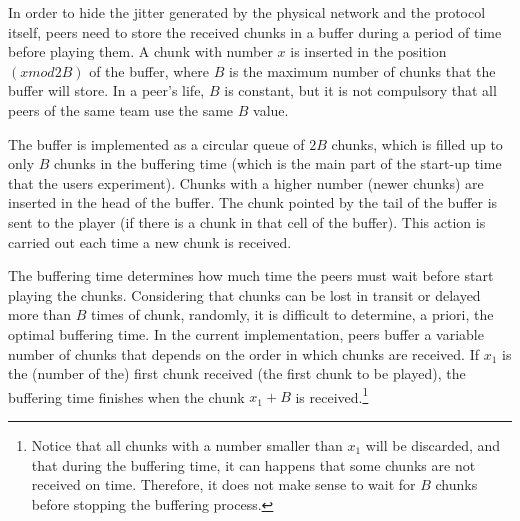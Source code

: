 
\label{sec:buffering_chunks}

In order to hide the jitter generated by the physical network and the
protocol itself, peers need to store the received chunks in a buffer
during a period of time before playing them. A chunk with number $x$
is inserted in the position $(x \mathit{mod} 2B)$ of the buffer, where
$B$ is the maximum number of chunks that the buffer will store. In a
peer's life, $B$ is constant, but it is not compulsory that all peers
of the same team use the same $B$ value.

The buffer is implemented as a circular queue of $2B$ chunks, which is
filled up to only $B$ chunks in the buffering time (which is the main
part of the start-up time that the users experiment). Chunks with a
higher number (newer chunks) are inserted in the head of the
buffer. The chunk pointed by the tail of the buffer is sent to the
player (if there is a chunk in that cell of the buffer). This action
is carried out each time a new chunk is received.

The buffering time determines how much time the peers must wait before
start playing the chunks. Considering that chunks can be lost in
transit or delayed more than $B$ times of chunk, randomly, it is
difficult to determine, a priori, the optimal buffering time. In the
current implementation, peers buffer a variable number of chunks that
depends on the order in which chunks are received. If $x_1$ is the
(number of the) first chunk received (the first chunk to be played),
the buffering time finishes when the chunk $x_1+B$ is
received.\footnote{Notice that all chunks with a number smaller than
  $x_1$ will be discarded, and that during the buffering time, it can
  happens that some chunks are not received on time. Therefore, it
  does not make sense to wait for $B$ chunks before stopping the
  buffering process.}


\begin{comment}
An heuristic that
works is the described in the Fig.~\ref{fig:DBS_peer_buffering}. As
can be seen, $\text{chunk\_to\_play}$ points to the first received
chunk, that not necessary is the received chunk with lower
index. After that, the
buffering finishes when a chunk with index $\text{chunk\_to\_play} +
\text{BUFFER\_SIZE}/2$ has been received.\footnote{This not means that
  $\text{BUFFER\_SIZE}/2$ chunks are available in the buffer.}
\end{comment}
